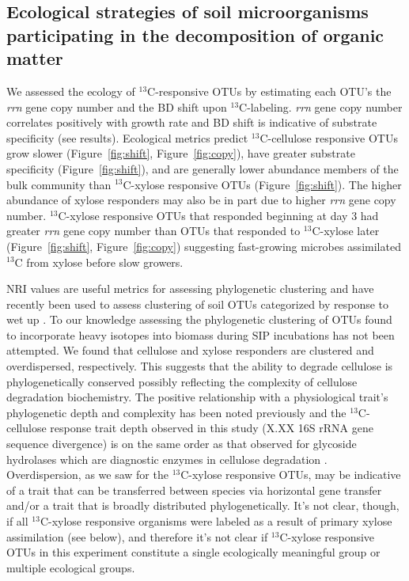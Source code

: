 \subsection{Ecological strategies of soil microorganisms participating in the
decomposition of organic matter}
We assessed the ecology of $^{13}$C-responsive OTUs by estimating each OTU's
the \textit{rrn} gene copy number and the BD shift upon $^{13}$C-labeling.
\textit{rrn} gene copy number correlates positively with growth rate
\citep{11125085} and BD shift is indicative of substrate specificity (see
results). Ecological metrics predict $^{13}$C-cellulose responsive OTUs grow
slower (Figure~\ref{fig:shift}, Figure~\ref{fig:copy}), have greater substrate
specificity (Figure~\ref{fig:shift}), and are generally lower abundance members
of the bulk community than $^{13}$C-xylose responsive OTUs
(Figure~\ref{fig:shift}). The higher abundance of xylose responders may also be
in part due to higher \textit{rrn} gene copy number. $^{13}$C-xylose responsive
OTUs that responded beginning at day 3 had greater \textit{rrn} gene copy
number than OTUs that responded to $^{13}$C-xylose later
(Figure~\ref{fig:shift}, Figure~\ref{fig:copy}) suggesting fast-growing
microbes assimilated $^{13}$C from xylose before slow growers. 

NRI values are useful metrics for assessing phylogenetic clustering
\citep{Webb2000} and have recently been used to assess clustering of soil OTUs
categorized by response to wet up \citep{Evans2014a,Placella2012}. To our
knowledge assessing the phylogenetic clustering of OTUs found to incorporate
heavy isotopes into biomass during SIP incubations has not been attempted. We
found that cellulose and xylose responders are clustered and overdispersed,
respectively. This suggests that the ability to degrade cellulose is
phylogenetically conserved possibly reflecting the complexity of cellulose
degradation biochemistry. The positive relationship with a physiological
trait's phylogenetic depth and complexity has been noted previously
\citep{Martiny2013a} and the $^{13}$C-cellulose response trait depth observed
in this study (X.XX 16S rRNA gene sequence divergence) is on the same order as
that observed for glycoside hydrolases which are diagnostic enzymes in
cellulose degradation \citep{Berlemont2013}. Overdispersion, as we saw for the
$^{13}$C-xylose responsive OTUs, may be indicative of a trait that can be
transferred between species via horizontal gene transfer and/or a trait that is
broadly distributed phylogenetically. It's not clear, though, if all
$^{13}$C-xylose responsive organisms were labeled as a result of primary xylose
assimilation (see below), and therefore it's not clear if $^{13}$C-xylose
responsive OTUs in this experiment constitute a single ecologically meaningful
group or multiple ecological groups. 

